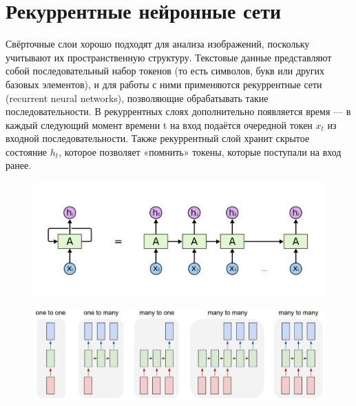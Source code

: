 \documentclass[paper=a4, fontsize=11pt]{scrartcl} %
\numberwithin{equation}{section} %
\numberwithin{figure}{section} %
\numberwithin{table}{section} %
\begin{document}
	\section{Рекуррентные нейронные сети}
	Свёрточные слои хорошо подходят для анализа изображений, поскольку учитывают их пространственную структуру. Текстовые данные представляют собой последовательный набор токенов (то есть символов, букв или других базовых элементов), и для работы с ними применяются рекуррентные сети (recurrent neural networks), позволяющие обрабатывать такие последовательности. В рекуррентных слоях дополнительно появляется время — в каждый следующий момент времени t на вход подаётся очередной токен $x_t$ из входной последовательности. Также рекуррентный слой хранит скрытое состояние $h_t$, которое позволяет «помнить» токены, которые поступали на вход ранее.


	\begin{figure}[h!]
		\centering
		\includegraphics[scale=0.24]{recurent}
	\end{figure}


	\begin{figure}[h!]
		\centering
		\includegraphics[scale=0.45]{recurr_type}
	\end{figure}

	
	
\end{document}
